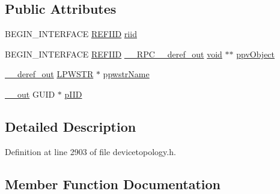 \subsection*{Public Attributes}
\begin{DoxyCompactItemize}
\item 
B\+E\+G\+I\+N\+\_\+\+I\+N\+T\+E\+R\+F\+A\+CE \hyperlink{px__win__ds_8c_a80ec49c8ae61e234197d5071d2df497d}{R\+E\+F\+I\+ID} \hyperlink{struct_i_control_interface_vtbl_a97ecd5c54625b69abad2e89ce3ae2837}{riid}
\item 
B\+E\+G\+I\+N\+\_\+\+I\+N\+T\+E\+R\+F\+A\+CE \hyperlink{px__win__ds_8c_a80ec49c8ae61e234197d5071d2df497d}{R\+E\+F\+I\+ID} \hyperlink{rpcsal_8h_a23bc188526f10656f9c79d950f6c3192}{\+\_\+\+\_\+\+R\+P\+C\+\_\+\+\_\+deref\+\_\+out} \hyperlink{sound_8c_ae35f5844602719cf66324f4de2a658b3}{void} $\ast$$\ast$ \hyperlink{struct_i_control_interface_vtbl_a1588e670f399a8435ffd46a7d0f87321}{ppv\+Object}
\item 
\hyperlink{sal_8h_a7dec33add44f7afd0eb61b1249a35298}{\+\_\+\+\_\+deref\+\_\+out} \hyperlink{mapinls_8h_acc28f72b93422cfd63a60e5a102a77b1}{L\+P\+W\+S\+TR} $\ast$ \hyperlink{struct_i_control_interface_vtbl_a6a086ffe853a07a8230b8c04fc3d20b3}{ppwstr\+Name}
\item 
\hyperlink{sal_8h_abb4c3c1135aab6c47cff22e7c16efb74}{\+\_\+\+\_\+out} G\+U\+ID $\ast$ \hyperlink{struct_i_control_interface_vtbl_a0e20cefc23c9a6d071373d9e30048dac}{p\+I\+ID}
\end{DoxyCompactItemize}


\subsection{Detailed Description}


Definition at line 2903 of file devicetopology.\+h.



\subsection{Member Function Documentation}
